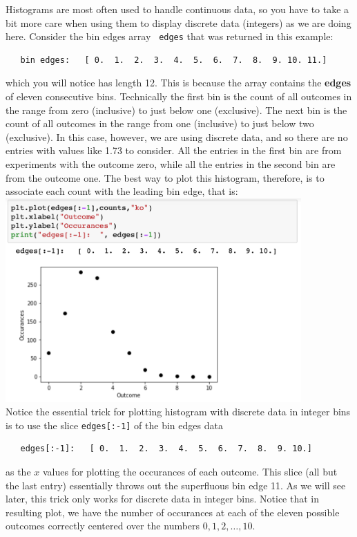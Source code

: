 Histograms are most often used to handle continuous data, so you
have to take a bit more care when using them to display discrete data
(integers) as we are doing here.  Consider the bin edges array {\tt
  edges} that was returned in this example:
\begin{verbatim}
   bin edges:   [ 0.  1.  2.  3.  4.  5.  6.  7.  8.  9. 10. 11.]
\end{verbatim}
which you will notice has length 12.  This is because the
array contains the {\bf edges} of eleven consecutive bins.  Technically the first bin
is the count of all outcomes in the range from zero (inclusive) to
just below one (exclusive).  The next bin is the count of all outcomes
in the range from one (inclusive) to just below two (exclusive).  In
this case, however, we are using discrete data, and so there are no entries with values like 1.73 to consider.
All the entries in the first bin are from experiments with the outcome
zero, while all the entries in the second bin are from the outcome
one.  The best way to plot this histogram, therefore, is
to associate each count with the leading bin edge, that is:\\
\includegraphics[width=0.85\textwidth]{figs/labs/distributions/plothist.png} \\
Notice the essential trick for plotting histogram with discrete data in integer bins is to use the slice {\tt edges[:-1]} of the bin edges data
\begin{verbatim}
   edges[:-1]:   [ 0.  1.  2.  3.  4.  5.  6.  7.  8.  9. 10.]
\end{verbatim}
as the $x$ values for plotting the occurances of each outcome.  This
slice (all but the last entry) essentially throws out the superfluous
bin edge 11.  As we will see later, this trick only works for discrete
data in integer bins.  Notice that in resulting plot, we have the number of occurances
at each of the eleven possible outcomes correctly centered over the
numbers $0,1,2,\ldots,10.$

